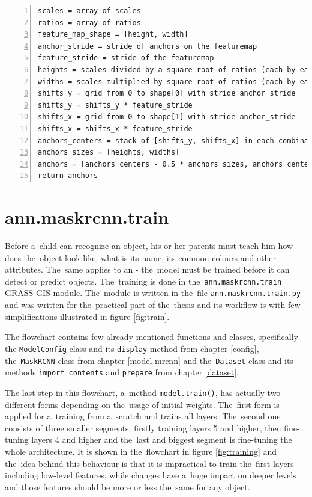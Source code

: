 {\scriptsize
\begin{lstlisting}[style=python, caption={generate\_anchors}, captionpos=b, 
label=code:anchors, deletekeywords={range, from, map, in},
backgroundcolor = \color{light-gray}, numbers=left, breaklines=true]
scales = array of scales
ratios = array of ratios
feature_map_shape = [height, width]
anchor_stride = stride of anchors on the featuremap
feature_stride = stride of the featuremap
heights = scales divided by a square root of ratios (each by each)
widths = scales multiplied by square root of ratios (each by each)
shifts_y = grid from 0 to shape[0] with stride anchor_stride
shifts_y = shifts_y * feature_stride
shifts_x = grid from 0 to shape[1] with stride anchor_stride
shifts_x = shifts_x * feature_stride
anchors_centers = stack of [shifts_y, shifts_x] in each combination
anchors_sizes = [heights, widths]
anchors = [anchors_centers - 0.5 * anchors_sizes, anchors_centers + 0.5 * anchors_sizes]
return anchors
\end{lstlisting}}

\section{ann.maskrcnn.train}
\label{train-module}

Before a~child can recognize an object, his or her parents must teach him how 
does the~object look like, what is its name, its common colours and other 
attributes. The~same applies to an  - the~model must be trained before it 
can detect or predict objects. The~training is done in the~\verb|ann.maskrcnn.train|
GRASS GIS module. The~module is written in the~file 
\verb|ann.maskrcnn.train.py| and was written for the~practical part of
the~thesis and its workflow is with few simplifications illustrated in figure 
\ref{fig:train}.

The flowchart contains few already-mentioned functions and classes, specifically 
the \verb|ModelConfig| class and its \verb|display| method from chapter 
\ref{config}, the~\verb|MaskRCNN| class from chapter \ref{model-mrcnn} and
the~\verb|Dataset| class and its methods \verb|import_contents| and \verb|prepare| 
from chapter \ref{dataset}.

The last step in this flowchart, a~method \verb|model.train()|, has actually two 
different forms depending on the~usage of initial weights. The~first form is 
applied for a~training from a~scratch and trains all layers. The~second one 
consists of three smaller segments; firstly training layers 5 and higher, then 
fine-tuning layers 4 and higher and the~last and biggest segment is fine-tuning 
the whole architecture. It is shown in the~flowchart in figure 
\ref{fig:training} and the~idea behind this behaviour is that it is impractical 
to train the~first layers including low-level features, while changes have
a~huge impact on deeper levels and those features should be more or less the~same 
for any object.

